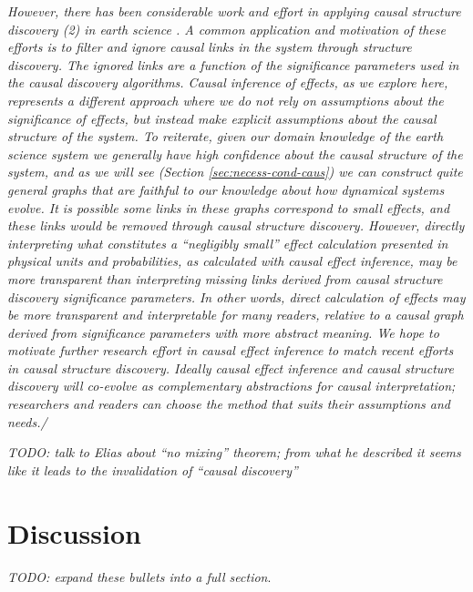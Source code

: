 \documentclass[12pt]{article}
\begin{document}
\textit{
  However, there has been considerable work and effort in applying
  causal structure discovery (2) in earth science
  \citep[e.g.,][]{ebert-uphoff2012,
    samarasinghe-casuality,runge-causal-timeseries,runge2019inferring}. A
  common application and motivation of these efforts is to filter and
  ignore causal links in the system through structure discovery. The
  ignored links are a function of the significance parameters used in
  the causal discovery algorithms. Causal inference of effects, as we
  explore here, represents a different approach where we do not rely on
  assumptions about the significance of effects, but instead make
  explicit assumptions about the causal structure of the system. To
  reiterate, given our domain knowledge of the earth science system we
  generally have high confidence about the causal structure of the
  system, and as we will see (Section \ref{sec:necess-cond-caus}) we can
  construct quite general graphs that are faithful to our knowledge
  about how dynamical systems evolve. It is possible some links in these
  graphs correspond to small effects, and these links would be removed
  through causal structure discovery. However, directly interpreting
  what constitutes a ``negligibly small'' effect calculation presented in
  physical units and probabilities, as calculated with causal effect
  inference, may be more transparent than interpreting missing links
  derived from causal structure discovery significance parameters. In
  other words, direct calculation of effects may be more transparent and
  interpretable for many readers, relative to a causal graph derived
  from significance parameters with more abstract meaning. We hope to
  motivate further research effort in causal effect inference to match
  recent efforts in causal structure discovery. Ideally causal effect
  inference and causal structure discovery will co-evolve as
  complementary abstractions for causal interpretation; researchers and
  readers can choose the method that suits their assumptions and
  needs./}

\textit{
  TODO: talk to Elias about ``no mixing'' theorem; from what he
  described it seems like it leads to the invalidation of ``causal
  discovery''
}

\section{Discussion}

\emph{TODO: expand these bullets into a full section}.
\end{document}
